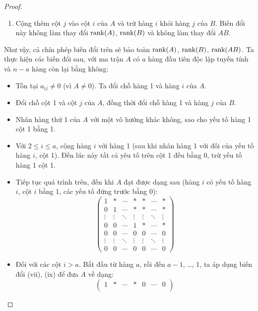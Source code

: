 \documentclass[class=nhvh-linear-algebra,crop=false]{standalone}
\begin{document}
\begin{proof}
\begin{enumerate}[label = (\roman*)]
		\item Cộng thêm cột $j$ vào cột $i$ của $A$ và trừ hàng $i$ khỏi hàng $j$ của $B$. Biến đổi này không làm thay đổi $\text{rank}(A)$, $\text{rank}(B)$ và không làm thay đổi $AB$.
	\end{enumerate}
	\par Như vậy, cả chín phép biến đổi trên sẽ bảo toàn $\text{rank}(A)$, $\text{rank}(B)$, $\text{rank}(AB)$. Ta thực hiện các biến đổi sau, với ma trận $A$ có $a$ hàng đầu tiên độc lập tuyến tính và $n - a$ hàng còn lại bằng không:
	\begin{itemize}
		\item Tồn tại $a_{ij}\ne 0$ (vì $A\ne 0$). Ta đổi chỗ hàng 1 và hàng $i$ của $A$.
		\item Đổi chỗ cột 1 và cột $j$ của $A$, đồng thời đổi chỗ hàng 1 và hàng $j$ của $B$.
		\item Nhân hàng thứ 1 của $A$ với một vô hướng khác không, sao cho yếu tố hàng 1 cột 1 bằng 1.
		\item Với $2\le i\le a$, cộng hàng $i$ với hàng 1 (sau khi nhân hàng 1 với đối của yếu tố hàng $i$, cột 1). Đến lúc này tất cả yêu tố trên cột 1 đều bằng 0, trừ yếu tố hàng 1 cột 1.
		\item Tiếp tục quá trình trên, đến khi $A$ đạt được dạng sau (hàng $i$ có yếu tố hàng $i$, cột $i$ bằng 1, các yếu tố đứng trước bằng 0):
		      \[
			      \begin{pmatrix}
				      1      & *      & \cdots & *      & *      & \cdots & *      \\
				      0      & 1      & \cdots & *      & *      & \cdots & *      \\
				      \vdots & \vdots & \ddots & \vdots & \vdots & \ddots & \vdots \\
				      0      & 0      & \cdots & 1      & *      & \cdots & *      \\
				      0      & 0      & \cdots & 0      & 0      & \cdots & 0      \\
				      \vdots & \vdots & \ddots & \vdots & \vdots & \ddots & \vdots \\
				      0      & 0      & \cdots & 0      & 0      & \cdots & 0
			      \end{pmatrix}
		      \]
		\item Đối với các cột $i > a$. Bắt đầu từ hàng $a$, rồi đến $a-1$, \ldots, 1, ta áp dụng biến đổi (vii), (ix) để đưa $A$ về dạng:
		      \[
			      \begin{pmatrix}
				      1      & *      & \cdots & *      & 0      & \cdots & 0      \\

\end{pmatrix}\]
\end{itemize}
\end{proof}
\end{document}
